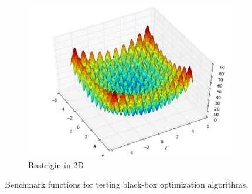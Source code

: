 \begin{figure}[ht]
\begin{subfigure}{0.24\textwidth}
    \centering\includegraphics[width=\textwidth]{Chapter4/img/rastrigin.pdf}
    \caption{Rastrigin in 2D}
  \end{subfigure}
  \caption{Benchmark functions for testing black-box optimization algorithms.}
  \label{fig:benchmarks}
\end{figure}

